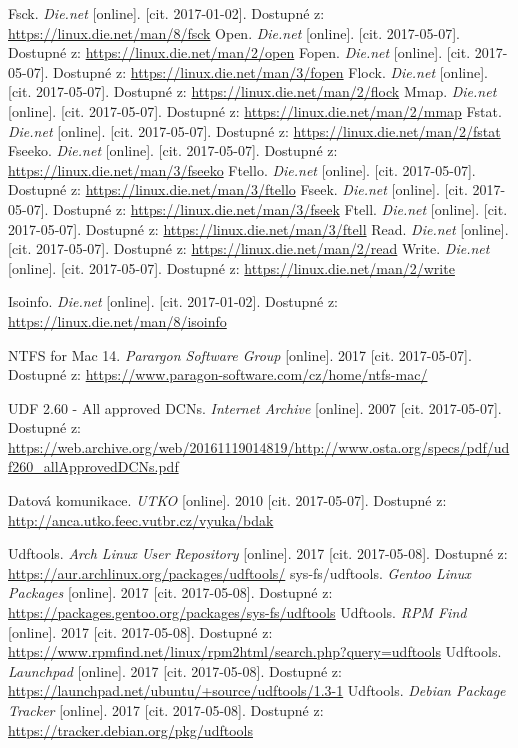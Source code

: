 \begin{literatura}{99}
    Fsck. \emph{Die.net} [online]. [cit. 2017-01-02]. Dostupné z: \url{https://linux.die.net/man/8/fsck}
    Open. \emph{Die.net} [online]. [cit. 2017-05-07]. Dostupné z: \url{https://linux.die.net/man/2/open}
    Fopen. \emph{Die.net} [online]. [cit. 2017-05-07]. Dostupné z: \url{https://linux.die.net/man/3/fopen}
    Flock. \emph{Die.net} [online]. [cit. 2017-05-07]. Dostupné z: \url{https://linux.die.net/man/2/flock}
    Mmap. \emph{Die.net} [online]. [cit. 2017-05-07]. Dostupné z: \url{https://linux.die.net/man/2/mmap}
    Fstat. \emph{Die.net} [online]. [cit. 2017-05-07]. Dostupné z: \url{https://linux.die.net/man/2/fstat}
    Fseeko. \emph{Die.net} [online]. [cit. 2017-05-07]. Dostupné z: \url{https://linux.die.net/man/3/fseeko}
    Ftello. \emph{Die.net} [online]. [cit. 2017-05-07]. Dostupné z: \url{https://linux.die.net/man/3/ftello}
    Fseek. \emph{Die.net} [online]. [cit. 2017-05-07]. Dostupné z: \url{https://linux.die.net/man/3/fseek}
    Ftell. \emph{Die.net} [online]. [cit. 2017-05-07]. Dostupné z: \url{https://linux.die.net/man/3/ftell}
    Read. \emph{Die.net} [online]. [cit. 2017-05-07]. Dostupné z: \url{https://linux.die.net/man/2/read}
    Write. \emph{Die.net} [online]. [cit. 2017-05-07]. Dostupné z: \url{https://linux.die.net/man/2/write}

    Isoinfo. \emph{Die.net} [online]. [cit. 2017-01-02]. Dostupné z: \url{https://linux.die.net/man/8/isoinfo}

    NTFS for Mac 14. \emph{Parargon Software Group} [online]. 2017 [cit. 2017-05-07]. Dostupné z: \url{https://www.paragon-software.com/cz/home/ntfs-mac/}

    UDF 2.60 - All approved DCNs. \emph{Internet Archive}\/ [online]. 2007 [cit. 2017-05-07]. Dostupné z: \url{https://web.archive.org/web/20161119014819/http://www.osta.org/specs/pdf/udf260_allApprovedDCNs.pdf}

    Datová komunikace. \emph{UTKO} [online]. 2010 [cit. 2017-05-07]. Dostupné z: \url{http://anca.utko.feec.vutbr.cz/vyuka/bdak}

    Udftools. \emph{Arch Linux User Repository} [online]. 2017 [cit. 2017-05-08]. Dostupné z: \url{https://aur.archlinux.org/packages/udftools/}
    sys-fs/udftools. \emph{Gentoo Linux Packages} [online]. 2017 [cit. 2017-05-08]. Dostupné z: \url{https://packages.gentoo.org/packages/sys-fs/udftools}
    Udftools. \emph{RPM Find} [online]. 2017 [cit. 2017-05-08]. Dostupné z: \url{https://www.rpmfind.net/linux/rpm2html/search.php?query=udftools}
    Udftools. \emph{Launchpad} [online]. 2017 [cit. 2017-05-08]. Dostupné z: \url{https://launchpad.net/ubuntu/+source/udftools/1.3-1}
    Udftools. \emph{Debian Package Tracker} [online]. 2017 [cit. 2017-05-08]. Dostupné z: \url{https://tracker.debian.org/pkg/udftools}


\end{literatura}

